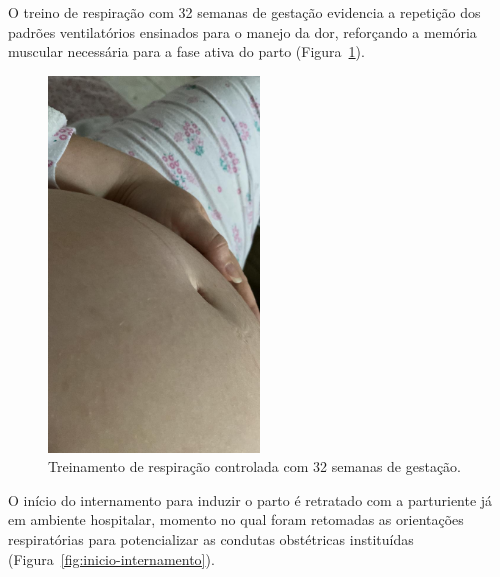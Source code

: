 \documentclass[openright]{tex/estilos/normas-utf-tex}
\begin{document}
O treino de respiração com 32 semanas de gestação evidencia a repetição dos padrões ventilatórios ensinados para o manejo da dor, reforçando a memória muscular necessária para a fase ativa do parto (Figura~\ref{fig:treino-respiracao-32-semanas}).

\begin{figure}[H]
    \centering
    \includegraphics[width=0.5\textwidth]{assets/imagens/IMG_0755.JPG}
    \caption{Treinamento de respiração controlada com 32 semanas de gestação.}
    \label{fig:treino-respiracao-32-semanas}
\end{figure}

O início do internamento para induzir o parto é retratado com a parturiente já em ambiente hospitalar, momento no qual foram retomadas as orientações respiratórias para potencializar as condutas obstétricas instituídas (Figura~\ref{fig:inicio-internamento}).
\end{document}
